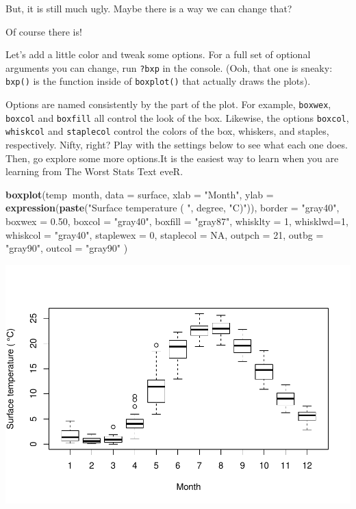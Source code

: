 \documentclass[
]{book}
\newenvironment{Shaded}{\begin{snugshade}}{\end{snugshade}}
\newcommand{\DataTypeTok}[1]{\textcolor[rgb]{0.13,0.29,0.53}{#1}}
\newcommand{\DecValTok}[1]{\textcolor[rgb]{0.00,0.00,0.81}{#1}}
\newcommand{\FloatTok}[1]{\textcolor[rgb]{0.00,0.00,0.81}{#1}}
\newcommand{\KeywordTok}[1]{\textcolor[rgb]{0.13,0.29,0.53}{\textbf{#1}}}
\newcommand{\NormalTok}[1]{#1}
\newcommand{\OperatorTok}[1]{\textcolor[rgb]{0.81,0.36,0.00}{\textbf{#1}}}
\newcommand{\OtherTok}[1]{\textcolor[rgb]{0.56,0.35,0.01}{#1}}
\newcommand{\StringTok}[1]{\textcolor[rgb]{0.31,0.60,0.02}{#1}}
\begin{document}
But, it is still much ugly. Maybe there is a way we can change that?

Of course there is!

Let's add a little color and tweak some options. For a full set of optional arguments you can change, run \texttt{?bxp} in the console. (Ooh, that one is sneaky: \texttt{bxp()} is the function inside of \texttt{boxplot()} that actually draws the plots).

Options are named consistently by the part of the plot. For example, \texttt{boxwex}, \texttt{boxcol} and \texttt{boxfill} all control the look of the box. Likewise, the options \texttt{boxcol}, \texttt{whiskcol} and \texttt{staplecol} control the colors of the box, whiskers, and staples, respectively. Nifty, right? Play with the settings below to see what each one does. Then, go explore some more options.It is the easiest way to learn when you are learning from The Worst Stats Text eveR.

\begin{Shaded}
\begin{Highlighting}[]
\KeywordTok{boxplot}\NormalTok{(temp}\OperatorTok{~}\NormalTok{month, }
        \DataTypeTok{data =}\NormalTok{ surface,}
        \DataTypeTok{xlab =} \StringTok{"Month"}\NormalTok{,}
        \DataTypeTok{ylab =} \KeywordTok{expression}\NormalTok{(}\KeywordTok{paste}\NormalTok{(}\StringTok{"Surface temperature ( "}\NormalTok{, degree, }\StringTok{"C)"}\NormalTok{)),      }
        \DataTypeTok{border =} \StringTok{"gray40"}\NormalTok{,}
        \DataTypeTok{boxwex =} \FloatTok{0.50}\NormalTok{, }\DataTypeTok{boxcol =} \StringTok{"gray40"}\NormalTok{, }\DataTypeTok{boxfill =} \StringTok{"gray87"}\NormalTok{,}
        \DataTypeTok{whisklty =} \DecValTok{1}\NormalTok{, }\DataTypeTok{whisklwd=}\DecValTok{1}\NormalTok{, }\DataTypeTok{whiskcol =} \StringTok{"gray40"}\NormalTok{,}
        \DataTypeTok{staplewex =} \DecValTok{0}\NormalTok{, }\DataTypeTok{staplecol =} \OtherTok{NA}\NormalTok{,}
        \DataTypeTok{outpch =} \DecValTok{21}\NormalTok{, }\DataTypeTok{outbg =} \StringTok{"gray90"}\NormalTok{, }\DataTypeTok{outcol =} \StringTok{"gray90"}
\NormalTok{        )}
\end{Highlighting}
\end{Shaded}

\includegraphics{worstr_files/figure-latex/unnamed-chunk-96-1.pdf}
\end{document}
